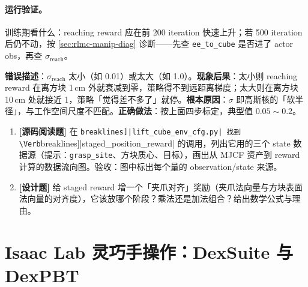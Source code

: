 \paragraph{运行验证。}训练期看什么：reaching reward 应在前 200 iteration 快速上升；若 500 iteration 后仍不动，按 \cref{sec:rlmc-manip-diag} 诊断——先查 \verb|ee_to_cube| 是否进了 actor obs，再查 $\sigma_{\text{reach}}$。

\begin{pitfall}
\textbf{错误描述}：$\sigma_{\text{reach}}$ 太小（如 0.01）或太大（如 1.0）。\textbf{现象后果}：太小则 reaching reward 在离方块 1\,cm 外就衰减到零，策略得不到远距离梯度；太大则在离方块 10\,cm 处就接近 1，策略「觉得差不多了」就停。\textbf{根本原因}：$\sigma$ 即高斯核的「软半径」，与工作空间尺度不匹配。\textbf{正确做法}：按上面四步标定，典型值 $0.05\sim 0.2$。
\end{pitfall}


\begin{practice}[本节练习]
\begin{enumerate}
  \item \textbf{[源码阅读题]} 在 \Verb[breaklines]|lift_cube_env_cfg.py| 找到 \Verb[breaklines]|staged_position_reward| 的调用，列出它用的三个 state 数据源（提示：\verb|grasp_site|、方块质心、目标），画出从 MJCF 资产到 reward 计算的数据流向图。验收：图中标出每个量的 observation/state 来源。
  \item \textbf{[设计题]} 给 staged reward 增一个「夹爪对齐」奖励（夹爪法向量与方块表面法向量的对齐度），它该放哪个阶段？乘法还是加法组合？给出数学公式与理由。
\end{enumerate}
\end{practice}

\section{Isaac Lab 灵巧手操作：DexSuite 与 DexPBT}
\label{sec:rlmc-manip-dex}

